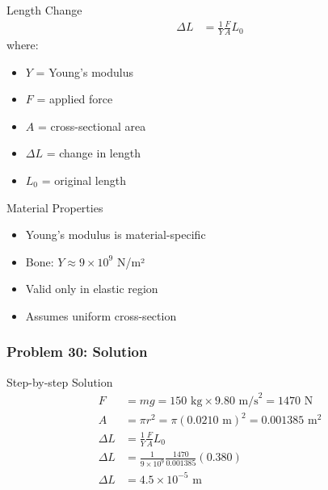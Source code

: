 \documentclass{beamer}
\begin{document}
\begin{frame}
\begin{block}{Length Change}
\begin{align*}
\Delta L &= \frac{1}{Y}\frac{F}{A}L_0
\end{align*}
where:
\begin{itemize}
\item $Y$ = Young's modulus
\item $F$ = applied force
\item $A$ = cross-sectional area
\item $\Delta L$ = change in length
\item $L_0$ = original length
\end{itemize}
\end{block}

\begin{alertblock}{Material Properties}
\begin{itemize}
\item Young's modulus is material-specific
\item Bone: $Y \approx 9 \times 10^9$ N/m²
\item Valid only in elastic region
\item Assumes uniform cross-section
\end{itemize}
\end{alertblock}
\end{frame}

\begin{frame}
\frametitle{Problem 30: Solution}
\begin{block}{Step-by-step Solution}
\begin{align*}
F &= mg = 150 \text{ kg} \times 9.80 \text{ m/s}^2 = 1470 \text{ N} \\
A &= \pi r^2 = \pi(0.0210 \text{ m})^2 = 0.001385 \text{ m}^2 \\
\Delta L &= \frac{1}{Y}\frac{F}{A}L_0 \\
\Delta L &= \frac{1}{9 \times 10^9}\frac{1470}{0.001385}(0.380) \\
\Delta L &= 4.5 \times 10^{-5} \text{ m}
\end{align*}
\end{block}
\end{frame}
\end{document}
